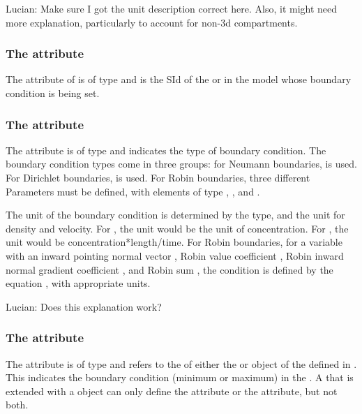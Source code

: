 {\color{red} Lucian: \notice Make sure I got the unit description correct here.  Also, it might need more explanation, particularly to account for non-3d compartments.}


\subsubsection{The  attribute}
The  attribute of \BoundaryCondition is of type  and is the SId of the \Species or \Parameter in the model whose boundary condition is being set.

\subsubsection{The  attribute}
The  attribute is of type  and indicates the type of boundary condition. The boundary condition types come in three groups: for Neumann boundaries,  is used.  For Dirichlet boundaries,  is used.  For Robin boundaries, three different Parameters must be defined, with \BoundaryCondition elements of type , , and .

The unit of the boundary condition is determined by the type, and the unit for density and velocity.  For , the unit would be the unit of concentration.  For , the unit would be concentration*length/time.  For Robin boundaries, for a variable  with an inward pointing normal vector , Robin value coefficient , Robin inward normal gradient coefficient , and Robin sum , the condition is defined by the equation , with appropriate units.

{\color{red} Lucian: \notice Does this explanation work?}

\subsubsection{The  attribute}
The  attribute is of type  and refers to the  of either the  or  object of the \CoordinateComponent defined in \Geometry. This  indicates the boundary condition (minimum or maximum) in the \CoordinateComponent. A \Parameter that is extended with a \BoundaryCondition object can only define the  attribute or the  attribute, but not both.

